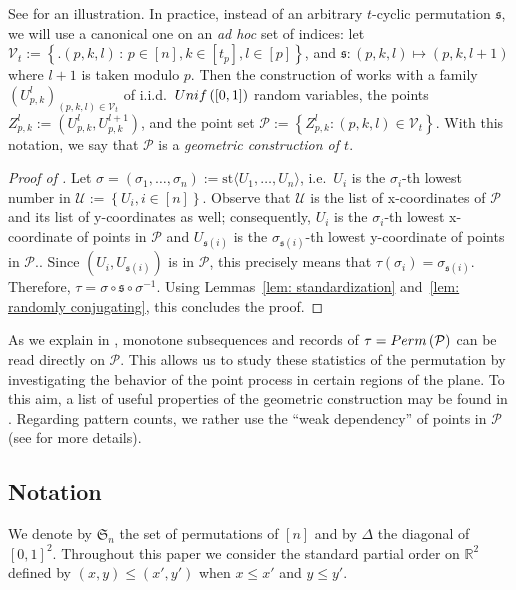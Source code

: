 \documentclass{article}
\theoremstyle{remark}
\def\R{\mathbb{R}}
\def\p{\!+\!}
\newcommand{\Unif}[1]{{\rm Unif}\left(#1\right)}
\def\S{\mathfrak{S}}
\def\fs{\mathfrak{s}}
\def\carre{[0,1]^2}
\def\pts{\mathcal{P}}
\newcommand{\perm}[1]{{\rm Perm}\left(#1\right)}
\newcommand{\st}[1]{\mathrm{st}\langle#1\rangle}
\def\Vert{\mathcal{V}}
\def\s{\mathfrak{s}}
\begin{document}
See  for an illustration.
In practice, instead of an arbitrary $t$-cyclic permutation $\fs$, we will use a canonical one on an \textit{ad hoc} set of indices:
let $\Vert_t := \left\{\big. (p,k,l) \,:\, p\in[n],k\in[t_p],l\in[p]\right\}$, and $\s : (p,k,l) \mapsto (p,k,l\p1)$ where $l\p1$ is taken modulo $p$.
Then the construction of  works with a family $\left(U_{p,k}^l\right)_{(p,k,l)\in\Vert_t}$ of i.i.d.~$\Unif{[0,1]}$ random variables, the points $Z_{p,k}^l := \left(U_{p,k}^l,U_{p,k}^{l+1}\right)$, and the point set $\pts := \left\{Z_{p,k}^l : (p,k,l)\in\Vert_t\right\}$.
With this notation, we say that $\pts$ is a \emph{geometric construction of $t$}.

\begin{proof}[Proof of ]
    Let $\sigma = (\sigma_1, \dots, \sigma_n) := \st{U_1, \dots, U_n}$, i.e.~$U_i$ is the $\sigma_i$-th lowest number in $\mathcal{U} := \left\{U_i, i\in[n]\right\}$.
    Observe that $\mathcal{U}$ is the list of x-coordinates of $\pts$ and its list of y-coordinates as well;
    consequently, $U_i$ is the $\sigma_i$-th lowest x-coordinate of points in $\pts$ and $U_{\fs(i)}$ is the $\sigma_{\fs(i)}$-th lowest y-coordinate of points in $\pts$..
    Since $\left( U_i, U_{\fs(i)} \right)$ is in $\pts$, this precisely means that $\tau(\sigma_i) = \sigma_{\fs(i)}$.
    Therefore, $\tau = \sigma\circ \fs\circ \sigma^{-1}$.
    Using Lemmas~\ref{lem: standardization} and~\ref{lem: randomly conjugating}, this concludes the proof.
\end{proof}

As we explain in , monotone subsequences and records of $\tau=\perm{\pts}$ can be read directly on $\pts$.
This allows us to study these statistics of the permutation by investigating the behavior of the point process in certain regions of the plane.
To this aim, a list of useful properties of the geometric construction may be found in .
Regarding pattern counts, we rather use the ``weak dependency'' of points in $\pts$ (see  for more details).


\subsection{Notation}
\label{sec: notation}

We denote by $\S_n$ the set of permutations of $[n]$ and by $\Delta$ the diagonal of $\carre$.
Throughout this paper we consider the standard partial order on $\R^2$ defined by $(x,y) \le (x',y')$ when $x\le x'$ and $y\le y'$.\\
\end{document}

